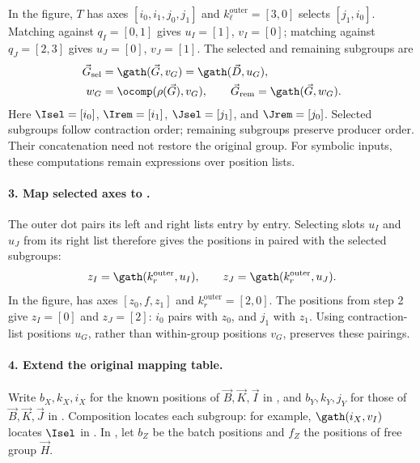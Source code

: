 In the figure, $T$ has axes $[i_0,i_1,j_0,j_1]$ and
$k_\ell^{\mathrm{outer}}=[3,0]$ selects $[j_1,i_0]$.
Matching against $q_I=[0,1]$ gives $u_I=[1]$, $v_I=[0]$;
matching against $q_J=[2,3]$ gives $u_J=[0]$, $v_J=[1]$.
The selected and remaining subgroups are
\begin{equation}
\begin{aligned}
 \vec G_{\mathrm{sel}}&=\gath(\vec G,v_G)=\gath(\vec D,u_G),\\
 w_G&=\ocomp(\rho(\vec G),v_G),\qquad
 \vec G_{\mathrm{rem}}=\gath(\vec G,w_G).
\end{aligned}
\end{equation}
Here $\Isel=[i_0]$, $\Irem=[i_1]$, $\Jsel=[j_1]$, and $\Jrem=[j_0]$.
Selected subgroups follow contraction order; remaining subgroups preserve
producer order. Their concatenation need not restore the original group.
For symbolic inputs, these computations remain expressions over position lists.

\paragraph{3. Map selected axes to .}
The outer dot pairs its left and right lists entry by entry. Selecting slots
$u_I$ and $u_J$ from its right list therefore gives the positions in 
paired with the selected subgroups:
\begin{equation}
 z_I=\gath(k_r^{\mathrm{outer}},u_I),\qquad
 z_J=\gath(k_r^{\mathrm{outer}},u_J).
\label{extended:eq:z-partners}
\end{equation}
In the figure,  has axes $[z_0,f,z_1]$ and
$k_r^{\mathrm{outer}}=[2,0]$. The positions from step 2 give
$z_I=[0]$ and $z_J=[2]$: $i_0$ pairs with $z_0$, and $j_1$ with $z_1$.
Using contraction-list positions $u_G$, rather than within-group positions
$v_G$, preserves these pairings.

\paragraph{4. Extend the original mapping table.}
Write $b_X,k_X,i_X$ for the known
positions of $\vec B,\vec K,\vec I$ in , and $b_Y,k_Y,j_Y$ for those of $\vec B,\vec K,\vec J$ in
. Composition locates each subgroup: for example,
$\gath(i_X,v_I)$ locates $\Isel$ in . In , let $b_Z$ be the
batch positions and $f_Z$ the positions of free group $\vec H$.

